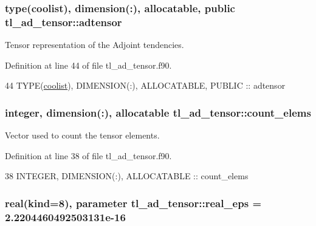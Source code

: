 \subsubsection[{\texorpdfstring{adtensor}{adtensor}}]{\setlength{\rightskip}{0pt plus 5cm}type({\bf coolist}), dimension(\+:), allocatable, public tl\+\_\+ad\+\_\+tensor\+::adtensor}\hypertarget{namespacetl__ad__tensor_af0a4e6cdc6d653fa808eedaa7ce331de}{}\label{namespacetl__ad__tensor_af0a4e6cdc6d653fa808eedaa7ce331de}


Tensor representation of the Adjoint tendencies. 



Definition at line 44 of file tl\+\_\+ad\+\_\+tensor.\+f90.


\begin{DoxyCode}
44   \textcolor{keywordtype}{TYPE}(\hyperlink{structtensor_1_1coolist}{coolist}), \textcolor{keywordtype}{DIMENSION(:)}, \textcolor{keywordtype}{ALLOCATABLE}, \textcolor{keywordtype}{PUBLIC} :: adtensor
\end{DoxyCode}
\subsubsection[{\texorpdfstring{count\+\_\+elems}{count_elems}}]{\setlength{\rightskip}{0pt plus 5cm}integer, dimension(\+:), allocatable tl\+\_\+ad\+\_\+tensor\+::count\+\_\+elems\hspace{0.3cm}{\ttfamily [private]}}\hypertarget{namespacetl__ad__tensor_a8836f34c3a96c44c487c7910ab8c7507}{}\label{namespacetl__ad__tensor_a8836f34c3a96c44c487c7910ab8c7507}


Vector used to count the tensor elements. 



Definition at line 38 of file tl\+\_\+ad\+\_\+tensor.\+f90.


\begin{DoxyCode}
38   \textcolor{keywordtype}{INTEGER}, \textcolor{keywordtype}{DIMENSION(:)}, \textcolor{keywordtype}{ALLOCATABLE} :: count\_elems
\end{DoxyCode}
\subsubsection[{\texorpdfstring{real\+\_\+eps}{real_eps}}]{\setlength{\rightskip}{0pt plus 5cm}real(kind=8), parameter tl\+\_\+ad\+\_\+tensor\+::real\+\_\+eps = 2.\+2204460492503131e-\/16\hspace{0.3cm}{\ttfamily [private]}}\hypertarget{namespacetl__ad__tensor_a05a4b79ccb098a47a400e175e12c1c6c}{}\label{namespacetl__ad__tensor_a05a4b79ccb098a47a400e175e12c1c6c}



